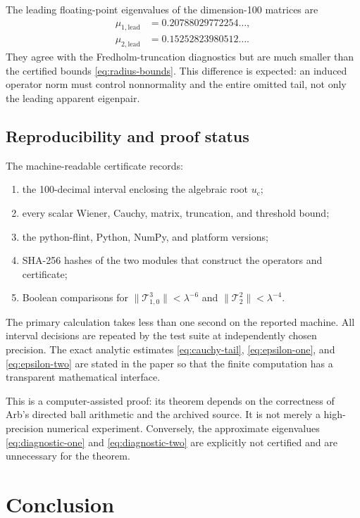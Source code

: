 \documentclass[11pt]{article}
\theoremstyle{definition}
\theoremstyle{remark}
\newcommand{\uc}{u_{\mathrm c}}
\newcommand{\cT}{\mathcal T}
\begin{document}
The leading floating-point eigenvalues of the dimension-100 matrices are
\begin{align}
 \mu_{1,\mathrm{lead}}
 &=0.20788029772254\ldots,
 \label{eq:diagnostic-one}\\
 \mu_{2,\mathrm{lead}}
 &=0.15252823980512\ldots.
 \label{eq:diagnostic-two}
\end{align}
They agree with the Fredholm-truncation diagnostics but are much smaller than
the certified bounds \eqref{eq:radius-bounds}.  This difference is expected:
an induced operator norm must control nonnormality and the entire omitted
tail, not only the leading apparent eigenpair.

\FloatBarrier
\subsection{Reproducibility and proof status}

The machine-readable certificate records:
\begin{enumerate}[label=(\roman*),leftmargin=2.8em]
 \item the 100-decimal interval enclosing the algebraic root $\uc$;
 \item every scalar Wiener, Cauchy, matrix, truncation, and threshold bound;
 \item the python-flint, Python, NumPy, and platform versions;
 \item SHA-256 hashes of the two modules that construct the operators and
 certificate;
 \item Boolean comparisons for
 $\|\cT_{1,0}^3\|<\lambda^{-6}$ and
 $\|\cT_2^2\|<\lambda^{-4}$.
\end{enumerate}
The primary calculation takes less than one second on the reported machine.
All interval decisions are repeated by the test suite at independently chosen
precision.  The exact analytic estimates
\eqref{eq:cauchy-tail}, \eqref{eq:epsilon-one}, and \eqref{eq:epsilon-two}
are stated in the paper so
that the finite computation has a transparent mathematical interface.

This is a computer-assisted proof: its theorem depends on the correctness of
Arb's directed ball arithmetic and the archived source.  It is not merely a
high-precision numerical experiment.  Conversely, the approximate
eigenvalues \eqref{eq:diagnostic-one} and \eqref{eq:diagnostic-two} are explicitly not
certified and are unnecessary for the theorem.

\section{Conclusion}
\end{document}
